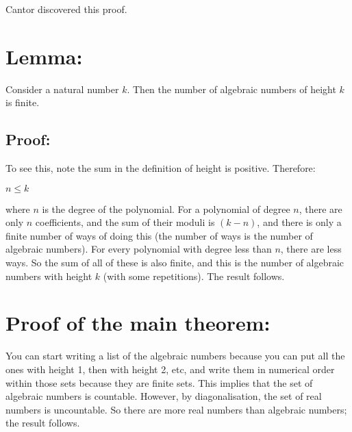 \documentclass[12pt]{article}
\begin{document}
Cantor discovered this proof.

\section*{Lemma:}

Consider a natural number $k$. Then the number of algebraic numbers of height $k$ is finite.

\subsection*{Proof:}

To see this, note the sum in the definition of height is positive. Therefore:

$
n \leq k
$

where $n$ is the degree of the polynomial. For a polynomial of degree $n$, there are only $n$ coefficients, and the sum of their moduli is $(k-n)$, and there is only a finite number of ways of doing this (the number of ways is the number of algebraic numbers). For every polynomial with degree less than $n$, there are less ways. So the sum of all of these is also finite, and this is the number of algebraic numbers with height $k$ (with some repetitions). The result follows.

\section*{Proof of the main theorem:}

You can start writing a list of the algebraic numbers because you can put all the ones with height 1, then with height 2, etc, and write them in numerical order within those sets because they are finite sets. This implies that the set of algebraic numbers is countable. However, by diagonalisation, the set of real numbers is uncountable. So there are more real numbers than algebraic numbers; the result follows.
\end{document}
